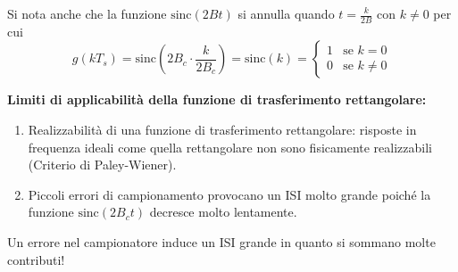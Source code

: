\begin{enumerate}
\begin{center}
          \end{center}

          Si nota anche che la funzione $\text{sinc}(2Bt)$ si annulla quando $t = \frac{k}{2B}$ con $k \neq 0$ per cui
          \[
              g(kT_s) = \text{sinc} \left(2B_c\cdot\frac{k}{2B_c}\right) = \text{sinc}(k) = 
              \begin{cases}
                  1 & \text{se } k=0    \\
                  0 & \text{se } k\neq0
              \end{cases}
          \]
\end{enumerate}


\textbf{Limiti di applicabilità della funzione di trasferimento rettangolare:}

\begin{enumerate}
    \item Realizzabilità di una funzione di trasferimento rettangolare: risposte in frequenza ideali come quella rettangolare non sono fisicamente realizzabili (Criterio di Paley-Wiener).
    \item Piccoli errori di campionamento provocano un ISI molto grande poiché la funzione $\text{sinc}(2B_ct)$ decresce molto lentamente.
\end{enumerate}

Un errore nel campionatore induce un ISI grande in quanto si sommano molte contributi!




